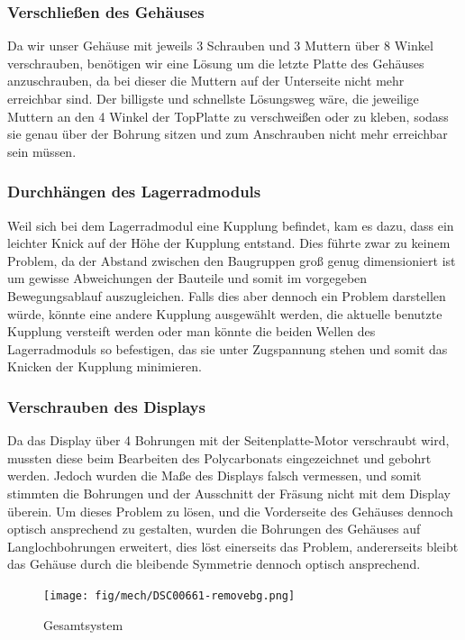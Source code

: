 \subsubsection{Verschließen des Gehäuses}
Da wir unser Gehäuse mit jeweils 3 Schrauben und 3 Muttern über 8 Winkel verschrauben, benötigen
wir eine Lösung um die letzte Platte des Gehäuses anzuschrauben, da bei dieser die Muttern
auf der Unterseite nicht mehr erreichbar sind. Der billigste und schnellste Lösungsweg wäre,
die jeweilige Muttern an den 4 Winkel der TopPlatte zu verschweißen oder zu kleben, sodass sie genau über der
Bohrung sitzen und zum Anschrauben nicht mehr erreichbar sein müssen.

\subsubsection{Durchhängen des Lagerradmoduls}
Weil sich bei dem Lagerradmodul eine Kupplung befindet, kam es dazu, dass ein leichter Knick
auf der Höhe der Kupplung entstand. Dies führte zwar zu keinem Problem, da der Abstand zwischen
den Baugruppen groß genug dimensioniert ist um gewisse Abweichungen der Bauteile und somit im
vorgegeben Bewegungsablauf auszugleichen. Falls dies aber dennoch ein Problem darstellen würde,
könnte eine andere Kupplung ausgewählt werden, die aktuelle benutzte Kupplung versteift werden oder
man könnte die beiden Wellen des Lagerradmoduls so befestigen, das sie unter
Zugspannung stehen und somit das Knicken der Kupplung minimieren.

\subsubsection{Verschrauben des Displays}
Da das Display über 4 Bohrungen mit der Seitenplatte-Motor verschraubt wird, mussten diese
beim Bearbeiten des Polycarbonats eingezeichnet und gebohrt werden. Jedoch wurden
die Maße des Displays falsch vermessen, und somit stimmten die Bohrungen und der Ausschnitt
der Fräsung nicht mit dem Display überein. Um dieses Problem zu lösen, und die
Vorderseite des Gehäuses dennoch optisch ansprechend zu gestalten, wurden die Bohrungen
des Gehäuses auf Langlochbohrungen erweitert, dies löst einerseits das Problem, andererseits
bleibt das Gehäuse durch die bleibende Symmetrie dennoch optisch ansprechend.

\begin{figure}[H]
    \centering
    \texttt{[image: fig/mech/DSC00661-removebg.png]}
    \caption{Gesamtsystem}
    \label{fig:GesamtsystemEcht}
\end{figure}

